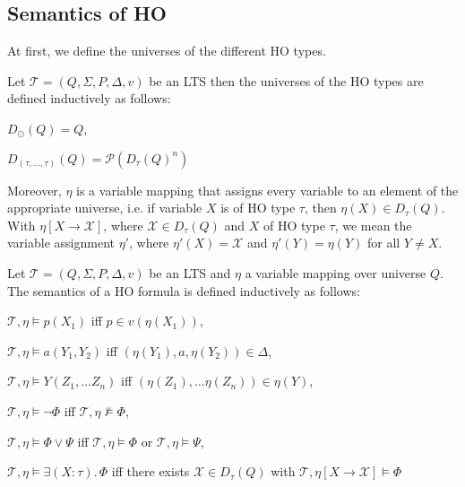 \subsection{Semantics of HO}\label{subsec:hoSemantics}

At first, we define the universes of the different HO types.

\begin{definition}
    Let $\mathcal{T} = (Q, \Sigma, P, \Delta, v)$ be an LTS then the universes of the HO types are defined inductively as follows:
    \begin{compactitem}
        \item $D_\odot(Q) = Q$,
        \item $D_{(\tau, \dots, \tau)}(Q) = \mathcal{P}(D_{\tau}(Q)^n)$
    \end{compactitem}
\end{definition}

Moreover, $\eta$ is a variable mapping that assigns every variable to an element of the appropriate universe, i.e. if
variable $X$ is of HO type $\tau$, then $\eta(X) \in D_{\tau}(Q)$. With $\eta[X \rightarrow \mathcal{X}]$,
where $\mathcal{X} \in D_\tau(Q)$ and $X$ of HO type $\tau$, we mean the variable assignment $\eta'$,
where $\eta'(X) = \mathcal{X}$ and $\eta'(Y) = \eta(Y)$ for all $Y \neq X$.

\begin{definition}
    Let $\mathcal{T} = (Q, \Sigma, P, \Delta, v)$ be an LTS and $\eta$ a variable mapping over universe $Q$. The
    semantics of a HO formula is defined inductively as follows:
    \begin{compactitem}
        \item $\mathcal{T}, \eta \models p(X_1)$ iff $p \in v(\eta(X_1))$,
        \item $\mathcal{T}, \eta \models a(Y_1, Y_2)$ iff $(\eta(Y_1), a, \eta(Y_2)) \in \Delta$,
        \item $\mathcal{T}, \eta \models Y(Z_1, \dots Z_n)$ iff $(\eta(Z_1), \dots
        \eta(Z_n)) \in \eta(Y)$,
        \item $\mathcal{T}, \eta \models \neg\Phi$ iff $\mathcal{T}, \eta\not\models\Phi$,
        \item $\mathcal{T}, \eta \models \Phi \vee \Psi$ iff $\mathcal{T}, \eta\models\Phi$ or $\mathcal{T},
        \eta\models\Psi$,
        \item $\mathcal{T}, \eta \models \exists (X\colon\tau).\,\Phi$ iff there exists $\mathcal{X} \in D_{\tau}
        (Q)$ with $\mathcal{T}, \eta[X \rightarrow \mathcal{X}] \models \Phi$
        \end{compactitem}
\end{definition}

